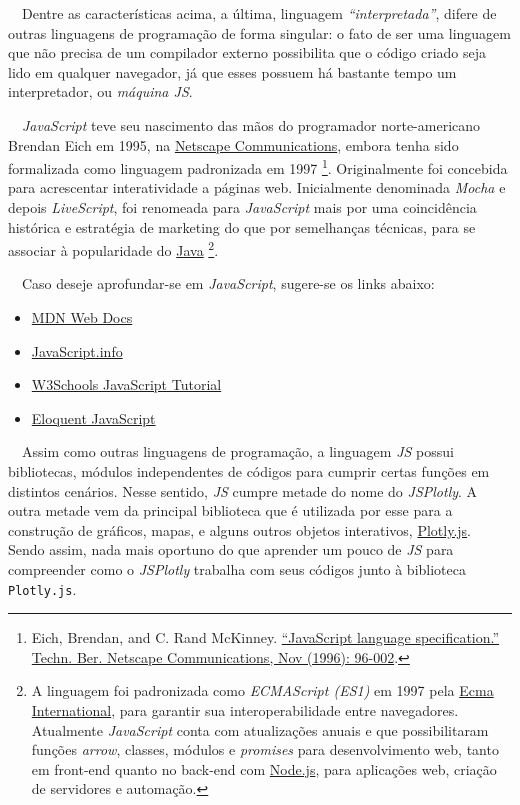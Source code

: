 \documentclass[
  portuguese,
  letterpaper,
  DIV=11,
  numbers=noendperiod]{scrreprt}
\providecommand{\tightlist}{%
  \setlength{\itemsep}{0pt}\setlength{\parskip}{0pt}}
\begin{document}
~~Dentre as características acima, a última, linguagem
\emph{``interpretada''}, difere de outras linguagens de programação de
forma singular: o fato de ser uma linguagem que não precisa de um
compilador externo possibilita que o código criado seja lido em qualquer
navegador, já que esses possuem há bastante tempo um interpretador, ou
\emph{máquina JS}.

~~\emph{JavaScript} teve seu nascimento das mãos do programador
norte-americano Brendan Eich em 1995, na
\href{https://isp.netscape.com/}{Netscape Communications}, embora tenha
sido formalizada como linguagem padronizada em 1997 \footnote{Eich,
  Brendan, and C. Rand McKinney.
  \href{https://archives.ecma-international.org/1996/TC39/96-002.pdf}{``JavaScript
  language specification.'' Techn. Ber. Netscape Communications, Nov
  (1996): 96-002}.}. Originalmente foi concebida para acrescentar
interatividade a páginas web. Inicialmente denominada \emph{Mocha} e
depois \emph{LiveScript}, foi renomeada para \emph{JavaScript} mais por
uma coincidência histórica e estratégia de marketing do que por
semelhanças técnicas, para se associar à popularidade do
\href{https://www.java.com/pt-BR/}{Java} \footnote{A linguagem foi
  padronizada como \emph{ECMAScript (ES1)} em 1997 pela
  \href{https://ecma-international.org/}{Ecma International}, para
  garantir sua interoperabilidade entre navegadores. Atualmente
  \emph{JavaScript} conta com atualizações anuais e que possibilitaram
  funções \emph{arrow}, classes, módulos e \emph{promises} para
  desenvolvimento web, tanto em front-end quanto no back-end com
  \href{https://nodejs.org/pt}{Node.js}, para aplicações web, criação de
  servidores e automação.}.

~~Caso deseje aprofundar-se em \emph{JavaScript}, sugere-se os links
abaixo:

\begin{itemize}
\tightlist
\item
  \href{https://developer.mozilla.org/pt-BR/docs/Web/JavaScript}{MDN Web
  Docs}
\item
  \href{https://javascript.info/}{JavaScript.info}
\item
  \href{https://www.w3schools.com/js/}{W3Schools JavaScript Tutorial}
\item
  \href{https://eloquentjavascript.net/}{Eloquent JavaScript}
\end{itemize}

~~Assim como outras linguagens de programação, a linguagem \emph{JS}
possui bibliotecas, módulos independentes de códigos para cumprir certas
funções em distintos cenários. Nesse sentido, \emph{JS} cumpre metade do
nome do \emph{JSPlotly}. A outra metade vem da principal biblioteca que
é utilizada por esse para a construção de gráficos, mapas, e alguns
outros objetos interativos,
\href{https://plotly.com/javascript/}{Plotly.js}. Sendo assim, {nada
mais oportuno do que aprender um pouco de \emph{JS} para compreender
como o \emph{JSPlotly} trabalha com seus códigos junto à biblioteca
\texttt{Plotly.js}}.
\end{document}

